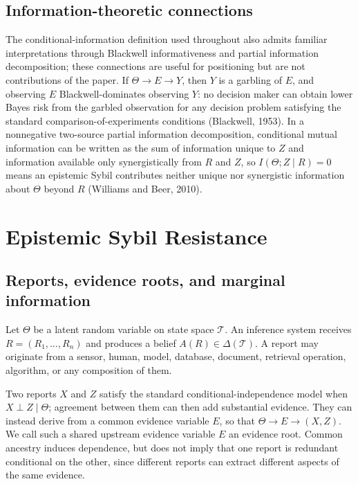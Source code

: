 \documentclass[11pt]{article}
\theoremstyle{definition}
\begin{document}
\subsection{Information-theoretic connections}

The conditional-information definition used throughout also admits familiar interpretations through Blackwell informativeness and partial information decomposition; these connections are useful for positioning but are not contributions of the paper. If $\Theta\rightarrow E\rightarrow Y$, then $Y$ is a garbling of $E$, and observing $E$ Blackwell-dominates observing $Y$: no decision maker can obtain lower Bayes risk from the garbled observation for any decision problem satisfying the standard comparison-of-experiments conditions (Blackwell, 1953). In a nonnegative two-source partial information decomposition, conditional mutual information can be written as the sum of information unique to $Z$ and information available only synergistically from $R$ and $Z$, so $I(\Theta;Z\mid R)=0$ means an epistemic Sybil contributes neither unique nor synergistic information about $\Theta$ beyond $R$ (Williams and Beer, 2010).

\section{Epistemic Sybil Resistance}
\label{sec:esr}

\subsection{Reports, evidence roots, and marginal information}
\label{sec:esr-reports}

Let $\Theta$ be a latent random variable on state space $\mathcal T$. An inference system receives $R=(R_1,\ldots,R_n)$ and produces a belief $A(R)\in\Delta(\mathcal T)$. A report may originate from a sensor, human, model, database, document, retrieval operation, algorithm, or any composition of them.

Two reports $X$ and $Z$ satisfy the standard conditional-independence model when $X\perp Z\mid\Theta$; agreement between them can then add substantial evidence. They can instead derive from a common evidence variable $E$, so that $\Theta\rightarrow E\rightarrow(X,Z)$. We call such a shared upstream evidence variable $E$ an evidence root. Common ancestry induces dependence, but does not imply that one report is redundant conditional on the other, since different reports can extract different aspects of the same evidence.
\end{document}
